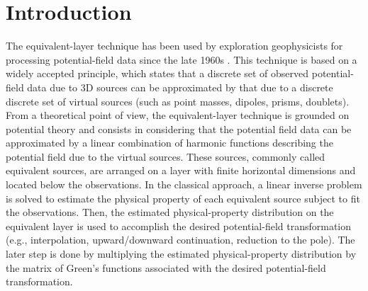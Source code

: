 \section{Introduction}

The equivalent-layer technique has been used by exploration geophysicists for processing potential-field 
data since the late 1960s \citep{dampney1969}. 
This technique is based on a widely accepted principle, which states that a discrete set of observed 
potential-field data due to 3D sources 
can be approximated by that due to a discrete discrete set of virtual sources (such as point 
masses, dipoles, prisms, doublets). From a theoretical point of view, the equivalent-layer 
technique is grounded on potential theory \citep{kellogg1967} and consists in considering 
that the potential field data can be approximated by a linear combination of harmonic 
functions describing the potential field due to the virtual sources. These sources, commonly 
called equivalent sources, are arranged on a layer with finite horizontal dimensions and 
located below the observations. In the classical approach, a linear inverse problem is 
solved to estimate the physical property of each equivalent source subject to fit the 
observations. Then, the estimated physical-property distribution on the equivalent layer is 
used to accomplish the desired potential-field transformation (e.g., interpolation, 
upward/downward continuation, reduction to the pole). The later step is done by multiplying 
the estimated physical-property distribution by the matrix of Green's functions associated 
with the desired potential-field transformation.

